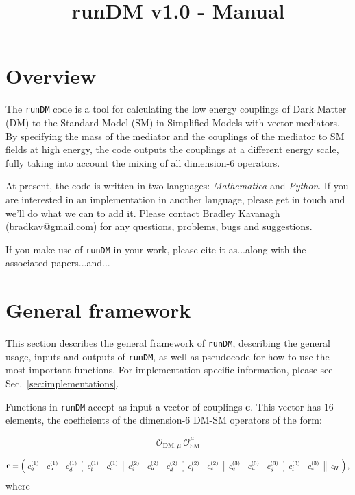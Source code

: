 \documentclass[notitlepage,12pt]{article}
\newcommand{\runDM}{\texttt{runDM}\xspace}
\begin{document}
\title{runDM v1.0 - Manual}
\maketitle


\section{Overview}

The \runDM code is a tool for calculating the low energy couplings of Dark Matter (DM) to the Standard Model (SM) in Simplified Models with vector mediators. By specifying the mass of the mediator and the couplings of the mediator to SM fields at high energy, the code outputs the couplings at a different energy scale, fully taking into account the mixing of all dimension-6 operators.

At present, the code is written in two languages: \textit{Mathematica} and \textit{Python}. If you are interested in an implementation in another language, please get in touch and we'll do what we can to add it. Please contact Bradley Kavanagh (\href{mailto:bradkav@gmail.com?subject=runDM v.10}{bradkav@gmail.com}) for any questions, problems, bugs and suggestions.

If you make use of \runDM in your work, please cite it as...along with the associated papers...and...



\section{General framework}

This section describes the general framework of \runDM, describing the general usage, inputs and outputs of \runDM, as well as pseudocode for how to use the most important functions. For implementation-specific information, please see Sec.~\ref{sec:implementations}.

Functions in \runDM accept as input a vector of couplings $\mathbf{c}$. This vector has 16 elements, the coefficients of the dimension-6 DM-SM operators of the form:

\begin{equation}
\mathcal{O}_{\mathrm{DM},\mu} \, \mathcal{O}_\mathrm{SM}^\mu
\end{equation}

\begin{equation}
\mathbf{c} = \left(\!\begin{array}{ccc:cc|ccc:cc|ccc:cc||c}
c_{ q}^{(1)} & c_{u}^{(1)} & c_{ d}^{(1)}\,&\, c_{ l}^{(1)} & c_{ e}^{(1)} \,&\, 
c_{ q}^{(2)} & c_{ u}^{(2)} & c_{ d}^{(2)} \,&\, c_{ l}^{(2)} & c_{ e}^{(2)} \,&\,
c_{ q}^{(3)} & c_{ u}^{(3)} & c_{ d}^{(3)} \,&\, c_{ l}^{(3)} & c_{ e}^{(3)} \,&\,
c_{ \!H} \end{array}\!\right),
\label{ed:cdef}
\end{equation}
where
\end{document}
